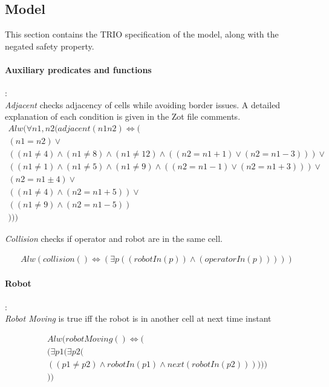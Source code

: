 \subsection{Model}
This section contains the TRIO specification of the model, along with the negated safety property.

\paragraph{Auxiliary predicates and functions}:\\

\textit{Adjacent} checks adjacency of cells while avoiding border issues. A detailed explanation of each condition is given in the Zot file comments.
\begin{align*}
	Alw(\forall n1,n2 (adjacent(n1 n2)\iff (\\
	(n1 = n2) \lor \\
	((n1 \neq 4)\land(n1 \neq 8)\land(n1 \neq 12)\land((n2=n1+1)\lor(n2=n1-3)))\lor \\
	((n1 \neq 1)\land(n1 \neq 5)\land(n1 \neq 9)\land((n2=n1-1)\lor(n2=n1+3)))\lor \\
	(n2 = n1\pm 4) \lor \\
	((n1 \neq 4)\land(n2 = n1+ 5)) \lor \\
	((n1 \neq 9)\land(n2 = n1- 5))  \\
	)))
\end{align*}

\textit{Collision} checks if operator and robot are in the same cell.

\begin{align*}
	Alw(collision()\iff (\exists p(
	(robotIn(p)) \land 
	(operatorIn(p)) 
	)))
\end{align*}


\paragraph{Robot}:\\

\textit{Robot Moving} is true iff the robot is in another cell at next time instant

\begin{align*}
	Alw(robotMoving()\iff (\\
	(\exists p1(\exists p2 (\\
	((p1\neq p2)\land robotIn(p1) \land next(robotIn(p2))) )))\\
	))
\end{align*}

